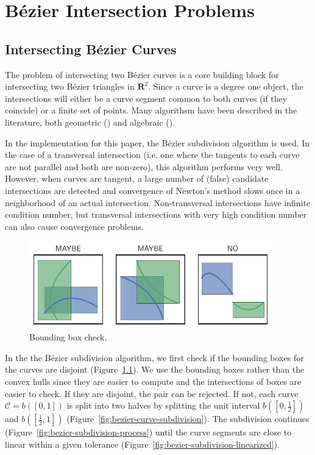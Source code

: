 \chapter{B\'{e}zier Intersection Problems}

\section{Intersecting B\'{e}zier Curves}

The problem of intersecting two B\'{e}zier curves is a core building
block for intersecting two B\'{e}zier triangles in \(\mathbf{R}^2\).
Since a curve is a degree one object, the intersections will either
be a curve segment common to both curves (if they coincide) or a finite
set of points.
Many algorithsm have been described in the literature, both
geometric (\cite{Sederberg1986, Sederberg1990, Kim1998}) and
algebraic (\cite{Manocha:CSD-92-698}).

In the implementation for this paper, the B\'{e}zier subdivision
algorithm is used.
In the case of a transversal intersection (i.e. one where the
tangents to each curve are not parallel and both are non-zero),
this algorithm performs very well. However, when curves are tangent,
a large number of (false) candidate intersections are detected and
convergence of Newton's method slows once in a neighborhood of an
actual intersection. Non-transversal intersections
have infinite condition number, but transversal intersections with
very high condition number can also cause convergence problems.

\begin{figure}
  \includegraphics[width=0.9375\textwidth]{../images/curved-mesh/bbox_check.pdf}
  \centering
  \caption{Bounding box check.}
  \label{fig:bounding-box-check}
\end{figure}

In the the B\'{e}zier subdivision algorithm, we first check if the
bounding boxes for the curves are disjoint
(Figure~\ref{fig:bounding-box-check}). We use the bounding boxes
rather than the convex hulls since they are easier to compute and
the intersections of boxes are easier to check.
If they are disjoint, the pair can be rejected. If not, each curve
\(\mathcal{C} = b\left(\left[0, 1\right]\right)\) is split into two halves
by splitting the unit interval \(b\left(\left[0, \frac{1}{2}\right]\right)\)
and \(b\left(\left[\frac{1}{2}, 1\right]\right)\)
(Figure~\ref{fig:bezier-curve-subdivision}). The subdivision continues
(Figure~\ref{fig:bezier-subdivision-process}) until
the curve segments are close to linear within a given tolerance
(Figure~\ref{fig:bezier-subdivision-linearized}).

